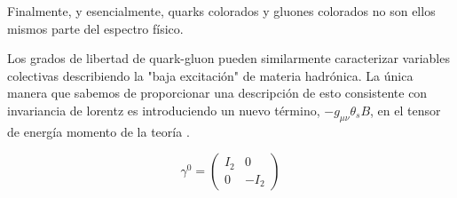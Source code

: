 Finalmente, y esencialmente, quarks colorados y gluones colorados no son ellos mismos parte del espectro físico.

Los grados de libertad de quark-gluon pueden similarmente caracterizar variables colectivas describiendo la "baja excitación" de materia hadrónica. La única manera que sabemos de proporcionar una descripción de esto consistente con invariancia de lorentz es introduciendo un nuevo término, $-{g}_{\mu \nu} {\theta}_{s} B$, en el tensor de energía momento de la teoría \cite{DeTar_1983, Chodos_1974, Han_1965, Greiner2001, DeGrand_1975}.

\[
{\gamma}^{0} = \left(
\begin{array}{cc}
{I}_{2} & 0\\
0 & -{I}_{2}
\end{array}
\right)
\]
